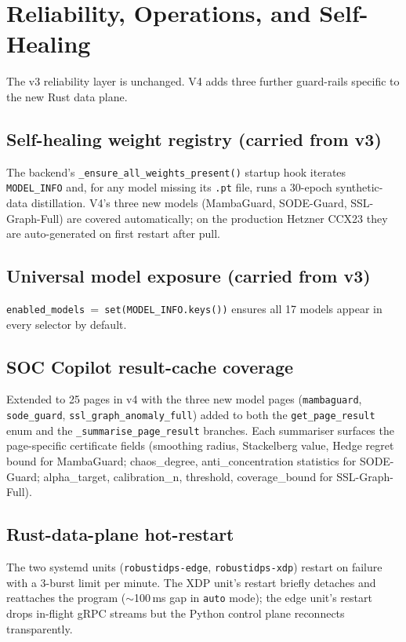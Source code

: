 \documentclass[11pt,a4paper]{article}
\begin{document}
\section{Reliability, Operations, and Self-Healing}
\label{sec:reliability}

The v3 reliability layer is unchanged.  V4 adds three further
guard-rails specific to the new Rust data plane.

\subsection{Self-healing weight registry (carried from v3)}
The backend's \texttt{\_ensure\_all\_weights\_present()} startup
hook iterates \texttt{MODEL\_INFO} and, for any model missing its
\texttt{.pt} file, runs a 30-epoch synthetic-data distillation.
V4's three new models (MambaGuard, SODE-Guard, SSL-Graph-Full) are
covered automatically; on the production Hetzner CCX23 they are
auto-generated on first restart after pull.

\subsection{Universal model exposure (carried from v3)}
\texttt{enabled\_models}~=~\texttt{set(MODEL\_INFO.keys())} ensures
all 17 models appear in every selector by default.

\subsection{SOC Copilot result-cache coverage}
Extended to 25 pages in v4 with the three new model pages
(\texttt{mambaguard}, \texttt{sode\_guard},
\texttt{ssl\_graph\_anomaly\_full}) added to both the
\texttt{get\_page\_result} enum and the
\texttt{\_summarise\_page\_result} branches.  Each summariser
surfaces the page-specific certificate fields (smoothing radius,
Stackelberg value, Hedge regret bound for MambaGuard;
chaos\_degree, anti\_concentration statistics for SODE-Guard;
alpha\_target, calibration\_n, threshold, coverage\_bound for
SSL-Graph-Full).

\subsection{Rust-data-plane hot-restart}
The two systemd units (\texttt{robustidps-edge},
\texttt{robustidps-xdp}) restart on failure with a 3-burst limit per
minute.  The XDP unit's restart briefly detaches and reattaches the
program ($\sim$100\,ms gap in \texttt{auto} mode); the edge unit's
restart drops in-flight gRPC streams but the Python control plane
reconnects transparently.
\end{document}
